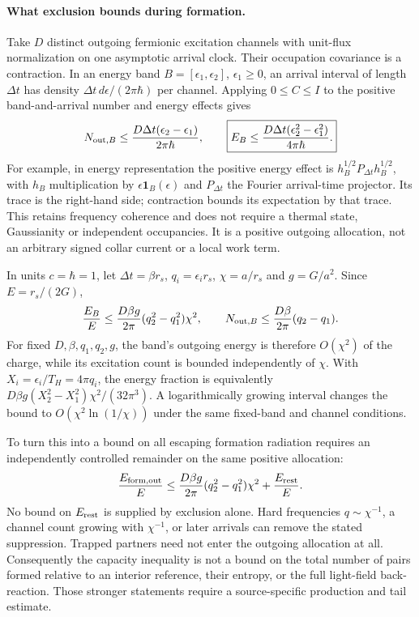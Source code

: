 \documentclass[11pt]{article}
\begin{document}
\paragraph{What exclusion bounds during formation.}
Take $D$ distinct outgoing fermionic excitation channels with unit-flux
normalization on one asymptotic arrival clock. Their occupation
covariance is a contraction. In an energy band
$B=[\epsilon_1,\epsilon_2]$, $\epsilon_1\ge0$, an arrival interval
of length $\Delta t$ has density
$\Delta t\,d\epsilon/(2\pi\hbar)$ per channel. Applying
$0\leq C\leq I$ to the positive band-and-arrival number and energy
effects gives
\[
 N_{{\rm out},B}\leq\frac{D\Delta t(\epsilon_2-\epsilon_1)}{2\pi\hbar},
 \qquad
 \boxed{E_B\leq
 \frac{D\Delta t(\epsilon_2^2-\epsilon_1^2)}{4\pi\hbar}.}
\]
For example, in energy representation the positive energy effect is
$h_B^{1/2}P_{\Delta t}h_B^{1/2}$, with $h_B$ multiplication by
$\epsilon\mathbf1_B(\epsilon)$ and $P_{\Delta t}$ the Fourier arrival-time
projector. Its trace is the right-hand side; contraction bounds its
expectation by that trace. This retains frequency coherence and does
not require a thermal state, Gaussianity or independent occupancies.
It is a positive outgoing allocation, not an arbitrary signed collar
current or a local work term.

In units $c=\hbar=1$, let $\Delta t=\beta r_s$,
$q_i=\epsilon_i r_s$, $\chi=a/r_s$ and $g=G/a^2$. Since
$E=r_s/(2G)$,
\[
 \frac{E_B}{E}
 \leq\frac{D\beta g}{2\pi}(q_2^2-q_1^2)\chi^2,\qquad
 N_{{\rm out},B}\leq\frac{D\beta}{2\pi}(q_2-q_1).
\]
For fixed $D,\beta,q_1,q_2,g$, the band's outgoing energy is therefore
$O(\chi^2)$ of the charge, while its excitation count is bounded
independently of $\chi$. With $X_i=\epsilon_i/T_H=4\pi q_i$, the
energy fraction is equivalently
$D\beta g(X_2^2-X_1^2)\chi^2/(32\pi^3)$.
A logarithmically growing interval changes the bound to
$O(\chi^2\ln(1/\chi))$ under the same fixed-band and channel conditions.

To turn this into a bound on all escaping formation radiation requires
an independently controlled remainder on the same positive allocation:
\[
 \frac{E_{\rm form,out}}{E}
 \leq \frac{D\beta g}{2\pi}(q_2^2-q_1^2)\chi^2
       +\frac{E_{\rm rest}}{E}.
\]
No bound on $E_{\rm rest}$ is supplied by exclusion alone. Hard
frequencies $q\sim\chi^{-1}$, a channel count growing with
$\chi^{-1}$, or later arrivals can remove the stated suppression.
Trapped partners need not enter the outgoing allocation at all.
Consequently the capacity inequality is not a bound on the total
number of pairs formed relative to an interior reference, their
entropy, or the full light-field back-reaction. Those stronger
statements require a source-specific production and tail estimate.
\end{document}

